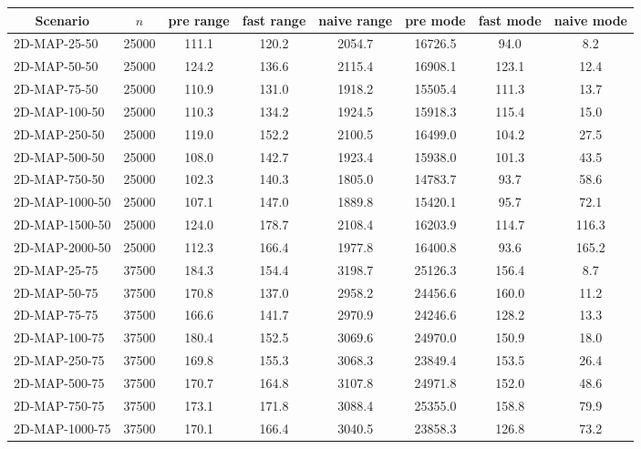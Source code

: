 \documentclass{article}
\begin{document}
\begin{center}        
\begin{table}[h]
    \begin{tabular}{|l||c|c|c|c|c|c|c|}
        \hline
        \multicolumn{1}{|c|}{Scenario} & $n$ & pre range & fast range & naive range & pre mode & fast mode & naive mode  \\
        \hline
        \hline
        2D-MAP-25-50 & 25000 & 111.1 & 120.2 & 2054.7 & 16726.5 & 94.0 & 8.2 \\
        2D-MAP-50-50 & 25000 & 124.2 & 136.6 & 2115.4 & 16908.1 & 123.1 & 12.4 \\
        2D-MAP-75-50 & 25000 & 110.9 & 131.0 & 1918.2 & 15505.4 & 111.3 & 13.7 \\
        2D-MAP-100-50 & 25000 & 110.3 & 134.2 & 1924.5 & 15918.3 & 115.4 & 15.0 \\
        2D-MAP-250-50 & 25000 & 119.0 & 152.2 & 2100.5 & 16499.0 & 104.2 & 27.5 \\
        2D-MAP-500-50 & 25000 & 108.0 & 142.7 & 1923.4 & 15938.0 & 101.3 & 43.5 \\
        2D-MAP-750-50 & 25000 & 102.3 & 140.3 & 1805.0 & 14783.7 & 93.7 & 58.6 \\
        2D-MAP-1000-50 & 25000 & 107.1 & 147.0 & 1889.8 & 15420.1 & 95.7 & 72.1 \\
        2D-MAP-1500-50 & 25000 & 124.0 & 178.7 & 2108.4 & 16203.9 & 114.7 & 116.3 \\
        2D-MAP-2000-50 & 25000 & 112.3 & 166.4 & 1977.8 & 16400.8 & 93.6 & 165.2 \\
        \hline
        2D-MAP-25-75 & 37500 & 184.3 & 154.4 & 3198.7 & 25126.3 & 156.4 & 8.7 \\
        2D-MAP-50-75 & 37500 & 170.8 & 137.0 & 2958.2 & 24456.6 & 160.0 & 11.2 \\
        2D-MAP-75-75 & 37500 & 166.6 & 141.7 & 2970.9 & 24246.6 & 128.2 & 13.3 \\
        2D-MAP-100-75 & 37500 & 180.4 & 152.5 & 3069.6 & 24970.0 & 150.9 & 18.0 \\
        2D-MAP-250-75 & 37500 & 169.8 & 155.3 & 3068.3 & 23849.4 & 153.5 & 26.4 \\
        2D-MAP-500-75 & 37500 & 170.7 & 164.8 & 3107.8 & 24971.8 & 152.0 & 48.6 \\
        2D-MAP-750-75 & 37500 & 173.1 & 171.8 & 3088.4 & 25355.0 & 158.8 & 79.9 \\
        2D-MAP-1000-75 & 37500 & 170.1 & 166.4 & 3040.5 & 23858.3 & 126.8 & 73.2 \\

\end{tabular}
\end{table}
\end{center}
\end{document}
